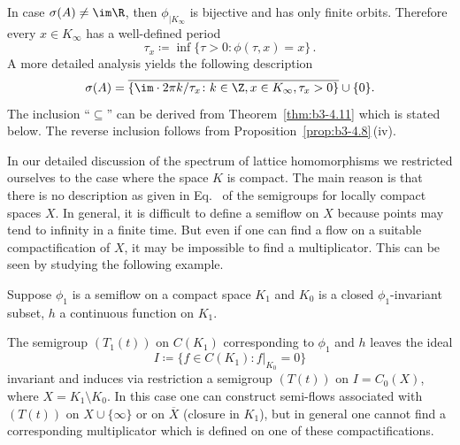 \begin{remark}\label{rem:b3-4.10}
	In case $\sigma(A) \neq \im\R$, then $\phi_{|K_{\infty}}$ is bijective and has only finite orbits.
	Therefore every $x \in K_{\infty}$ has a well-defined period 
    \[
    \tau_{x} \coloneq \inf\{\tau > 0 \colon \phi(\tau,x) = x\}\,.
    \]
	A more detailed analysis yields the following description 
	\begin{equation}\label{eq:b3-4.16}
		\sigma(A) = \overline{\{\im \cdot 2\pi k/\tau_{x} \colon k \in \Z, x \in K_{\infty}, \tau_{x} > 0\}} \cup \{0\}.
	\end{equation}
	The inclusion \enquote{$\subseteq$} can be derived from Theorem~\ref{thm:b3-4.11} which is stated below.
	The reverse inclusion follows from Proposition~\ref{prop:b3-4.8}\,(iv).
\end{remark}
	
	In our detailed discussion of the spectrum of lattice homomorphisms we restricted ourselves to the case where the space $K$ is compact.
	The main reason is that there is no description as given in Eq.~ of the semigroups for locally compact spaces $X$.
	In general, it is difficult to define a semiflow on $X$ because points may tend to infinity in a finite time.
	But even if one can find a flow on a suitable compactification of\/ $X$, it may be impossible to find a multiplicator.
	This can be seen by studying the following example.
	
	Suppose $\phi_{1}$ is a semiflow on a compact space $K_{1}$ and $K_{0}$ is a closed $\phi_{1}$-invariant subset, $h$ a continuous function on $K_{1}$.

    The semigroup $(T_{1}(t))$ on $C(K_{1})$ corresponding to $\phi_{1}$ and $h$ leaves the ideal 
    \[
    I \coloneq \{f \in C(K_{1}) \colon f|_{K_{0}} = 0\}
    \] 
    invariant and induces via restriction a semigroup $(T(t))$ on $I = C_{0}(X)$, where $X = K_{1} \setminus K_{0}$.
    In this case one can construct semi-flows associated with $(T(t))$ on $X\cup\{\infty\}$ or on $\overline{X}$ (closure in $K_{1}$), but in general one cannot find a corresponding multiplicator which is defined on one of these compactifications.

